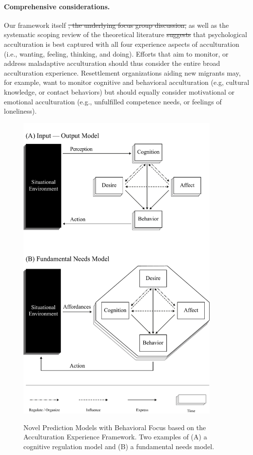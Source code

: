 \documentclass[man, 12pt, a4paper, mask]{apa7}
\providecommand{\DIFaddtex}[1]{{\protect\color{blue}\uwave{#1}}} %
\providecommand{\DIFdeltex}[1]{{\protect\color{red}\sout{#1}}}                      %
\providecommand{\DIFaddbegin}{} %
\providecommand{\DIFaddend}{} %
\providecommand{\DIFdelbegin}{} %
\providecommand{\DIFdelend}{} %
\providecommand{\DIFadd}[1]{\texorpdfstring{\DIFaddtex{#1}}{#1}} %
\providecommand{\DIFdel}[1]{\texorpdfstring{\DIFdeltex{#1}}{}} %
\newcommand{\DIFscaledelfig}{0.5}
\newlength{\DIFdelgraphicswidth} %
\newlength{\DIFdelgraphicsheight} %
\newcommand{\DIFaddincludegraphics}[2][]{{\color{blue}\fbox{\DIFOincludegraphics[#1]{#2}}}} %
\newcommand{\DIFdelincludegraphics}[2][]{%
\sbox{\DIFdelgraphicsbox}{\DIFOincludegraphics[#1]{#2}}%
\settoboxwidth{\DIFdelgraphicswidth}{\DIFdelgraphicsbox} %
\settoboxtotalheight{\DIFdelgraphicsheight}{\DIFdelgraphicsbox} %
\scalebox{\DIFscaledelfig}{%
\parbox[b]{\DIFdelgraphicswidth}{\usebox{\DIFdelgraphicsbox}\\[-\baselineskip] \rule{\DIFdelgraphicswidth}{0em}}\llap{\resizebox{\DIFdelgraphicswidth}{\DIFdelgraphicsheight}{%
\setlength{\unitlength}{\DIFdelgraphicswidth}%
\begin{picture}(1,1)%
\thicklines\linethickness{2pt} %
{\color[rgb]{1,0,0}\put(0,0){\framebox(1,1){}}}%
{\color[rgb]{1,0,0}\put(0,0){\line( 1,1){1}}}%
{\color[rgb]{1,0,0}\put(0,1){\line(1,-1){1}}}%
\end{picture}%
}\hspace*{3pt}}} %
} %
\DeclareRobustCommand{\DIFaddbegin}{\DIFOaddbegin \let\includegraphics\DIFaddincludegraphics} %
\DeclareRobustCommand{\DIFaddend}{\DIFOaddend \let\includegraphics\DIFOincludegraphics} %
\DeclareRobustCommand{\DIFdelbegin}{\DIFOdelbegin \let\includegraphics\DIFdelincludegraphics} %
\DeclareRobustCommand{\DIFdelend}{\DIFOaddend \let\includegraphics\DIFOincludegraphics} %
\begin{document}
\paragraph{Comprehensive considerations.} Our framework itself \DIFdelbegin \DIFdel{, the underlying focus group discussion, }\DIFdelend as well as the systematic scoping review of the theoretical literature \DIFdelbegin \DIFdel{suggests }\DIFdelend \DIFaddbegin \DIFadd{suggest }\DIFaddend that psychological acculturation is best captured with all four experience aspects of acculturation (i.e., wanting, feeling, thinking, and doing). Efforts that aim to monitor, or address maladaptive acculturation should thus consider the entire broad acculturation experience. Resettlement organizations aiding new migrants may, for example, want to monitor cognitive and behavioral acculturation (e.g, cultural knowledge, or contact behaviors) but should equally consider motivational or emotional acculturation (e.g., unfulfilled competence needs, or feelings of loneliness). 



\begin{figure}[ht!]
\centering
    \caption{Novel Prediction Models with Behavioral Focus based on the Acculturation Experience Framework. Two examples of (A) a cognitive regulation model and (B) a fundamental needs model.}
\includegraphics[width=0.9\textwidth]{Figures/NovelPredictionsBehaviorTime.pdf}
\label{fig:NovelModels}
\end{figure}
\end{document}
